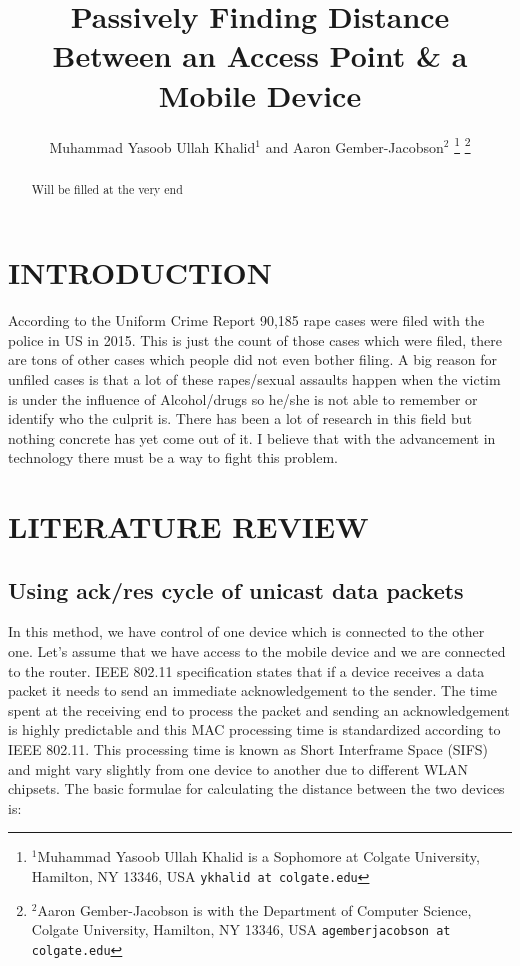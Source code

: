 \documentclass[letterpaper, 10 pt, conference]{ieeeconf}  %
\title{\LARGE \bf
Passively Finding Distance Between an Access Point \& a Mobile Device
}
\author{Muhammad Yasoob Ullah Khalid$^{1}$ and Aaron Gember-Jacobson$^{2}$%
\thanks{$^{1}$Muhammad Yasoob Ullah Khalid is a Sophomore at Colgate University, Hamilton, NY 13346, USA
        {\tt\small ykhalid at colgate.edu}}%
\thanks{$^{2}$Aaron Gember-Jacobson is with the Department of Computer Science, Colgate University, Hamilton, NY 13346, USA
        {\tt\small agemberjacobson at colgate.edu}}%
}
\begin{document}
\maketitle
\thispagestyle{empty}
\pagestyle{empty}


\begin{abstract}

Will be filled at the very end

\end{abstract}


\section{INTRODUCTION}

According to the Uniform Crime Report 90,185 rape cases were filed with the police in US in 2015. This is just the count of those cases which were filed, there are tons of other cases which people did not even bother filing. A big reason for unfiled cases is that a lot of these rapes/sexual assaults happen when the victim is under the influence of Alcohol/drugs so he/she is not able to remember or identify who the culprit is. There has been a lot of research in this field but nothing concrete has yet come out of it. I believe that with the advancement in technology there must be a way to fight this problem. 

\section{LITERATURE REVIEW}

\subsection{Using ack/res cycle of unicast data packets}

In this method, we have control of one device which is connected to the other one. Let’s assume that we have access to the mobile device and we are connected to the router. IEEE 802.11 specification states that if a device receives a data packet it needs to send an immediate acknowledgement to the sender. The time spent at the receiving end to process the packet and sending an acknowledgement is highly predictable and this MAC processing time is standardized according to IEEE 802.11. This processing time is known as Short Interframe Space (SIFS) and might vary slightly from one device to another due to different WLAN chipsets. 
The basic formulae for calculating the distance between the two devices is:
\end{document}
